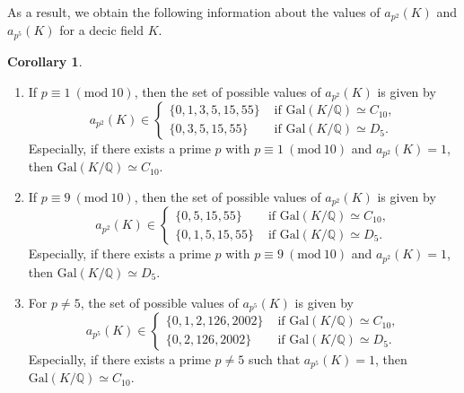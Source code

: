 \documentclass[letterpaper, 10pt]{article}
\newcommand{\Gal}{\mathrm{Gal}}
\newcommand{\Mod}[1]{\ (\mathrm{mod}\ #1)}
\newcommand{\bQ}{\mathbb{Q}}
\newcommand{\1}{\mathds{1}}	%
\theoremstyle{definition}
\newtheorem{corollary}[theorem]{Corollary}
\theoremstyle{remark}
\begin{document}
As a result, we obtain the following information about the values of $a_{p^2}(K)$ and $a_{p^5}(K)$ for a decic field $K$.

\begin{corollary} \label{cor:decic_zeta} \hfill
    \begin{enumerate}
        \item If $p \equiv 1 \Mod{10}$, then the set of possible values of $a_{p^2}(K)$ is given by 
        \begin{equation}
            a_{p^2}(K) \in \begin{cases}
                \{0, 1, 3, 5, 15, 55\} & \text{ if } \Gal(K / \bQ) \simeq C_{10},\\
                \{0, 3, 5, 15, 55\} & \text{ if }  \Gal(K / \bQ) \simeq D_5.
            \end{cases}
        \end{equation}
        Especially, if there exists a prime $p$ with $p \equiv 1 \Mod{10}$ and $a_{p^2}(K) = 1$, then $\Gal(K / \bQ) \simeq C_{10}$.
        \item If $p \equiv 9 \Mod{10}$, then the set of possible values of $a_{p^2}(K)$ is given by
        \begin{equation}
            a_{p^2}(K) \in \begin{cases}
                \{0, 5, 15, 55\} & \text{ if }  \Gal(K / \bQ) \simeq C_{10},\\
                \{0, 1, 5, 15, 55\} & \text{ if }  \Gal(K / \bQ) \simeq D_5.
            \end{cases}
        \end{equation}
        Especially, if there exists a prime $p$ with $p \equiv 9 \Mod{10}$ and $a_{p^2}(K) = 1$, then $\Gal(K / \bQ) \simeq D_{5}$.
        \item For $p \ne 5$, the set of possible values of $a_{p^5}(K)$ is given by
        \begin{equation}
            a_{p^5}(K) \in \begin{cases} \{0, 1, 2, 126, 2002\} & \text{ if }  \mathrm{Gal}(K/\mathbb{Q}) \simeq C_{10},\\ \{0, 2, 126, 2002\} & \text{ if }  \mathrm{Gal}(K / \mathbb{Q}) \simeq D_5.\end{cases}
        \end{equation}
        Especially, if there exists a prime $p \ne 5$ such that $a_{p^5}(K) = 1$, then $\Gal(K / \bQ) \simeq C_{10}$.
    \end{enumerate}

\end{corollary}
\end{document}
